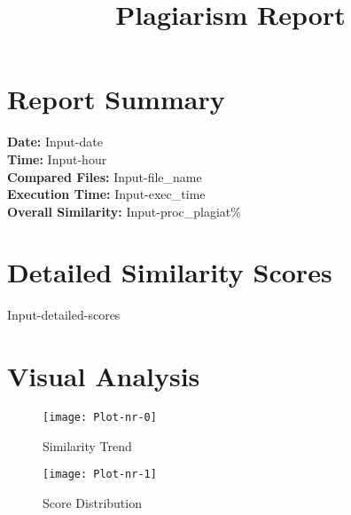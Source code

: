\documentclass[12pt]{article}
\title{Plagiarism Report}
\begin{document}
\maketitle
\section*{Report Summary}
\textbf{Date:} Input-date\\
\textbf{Time:} Input-hour\\
\textbf{Compared Files:} Input-file_name\\
\textbf{Execution Time:} Input-exec_time\\
\textbf{Overall Similarity:} Input-proc_plagiat\%

\section*{Detailed Similarity Scores}
\begin{enumerate}
Input-detailed-scores
\end{enumerate}

\section*{Visual Analysis}
\begin{figure}[H]
    \centering
    \texttt{[image: Plot-nr-0]}
    \caption{Similarity Trend}
\end{figure}

\begin{figure}[H]
    \centering
    \texttt{[image: Plot-nr-1]}
    \caption{Score Distribution}
\end{figure}
\end{document}

